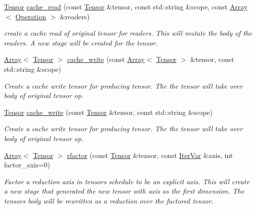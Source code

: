 \begin{DoxyCompactItemize}
\hyperlink{classtvm_1_1te_1_1Tensor}{Tensor} \hyperlink{classtvm_1_1te_1_1Schedule_a38ef95a62faf0c15f132847efa20249b}{cache\+\_\+read} (const \hyperlink{classtvm_1_1te_1_1Tensor}{Tensor} \&tensor, const std\+::string \&scope, const \hyperlink{classtvm_1_1Array}{Array}$<$ \hyperlink{classtvm_1_1te_1_1Operation}{Operation} $>$ \&readers)
\begin{DoxyCompactList}\small\item\em create a cache read of original tensor for readers. This will mutate the body of the readers. A new stage will be created for the tensor. \end{DoxyCompactList}\item 
\hyperlink{classtvm_1_1Array}{Array}$<$ \hyperlink{classtvm_1_1te_1_1Tensor}{Tensor} $>$ \hyperlink{classtvm_1_1te_1_1Schedule_ada9825f59ef130a0ab0b3a01ea348d71}{cache\+\_\+write} (const \hyperlink{classtvm_1_1Array}{Array}$<$ \hyperlink{classtvm_1_1te_1_1Tensor}{Tensor} $>$ \&tensor, const std\+::string \&scope)
\begin{DoxyCompactList}\small\item\em Create a cache write tensor for producing tensor. The the tensor will take over body of original tensor op. \end{DoxyCompactList}\item 
\hyperlink{classtvm_1_1te_1_1Tensor}{Tensor} \hyperlink{classtvm_1_1te_1_1Schedule_a15582f96d0aaf9a2bd9f2afcad3935d4}{cache\+\_\+write} (const \hyperlink{classtvm_1_1te_1_1Tensor}{Tensor} \&tensor, const std\+::string \&scope)
\begin{DoxyCompactList}\small\item\em Create a cache write tensor for producing tensor. The the tensor will take over body of original tensor op. \end{DoxyCompactList}\item 
\hyperlink{classtvm_1_1Array}{Array}$<$ \hyperlink{classtvm_1_1te_1_1Tensor}{Tensor} $>$ \hyperlink{classtvm_1_1te_1_1Schedule_a34ae85add41bbed0140726d024d08862}{rfactor} (const \hyperlink{classtvm_1_1te_1_1Tensor}{Tensor} \&tensor, const \hyperlink{classtvm_1_1tir_1_1IterVar}{Iter\+Var} \&axis, int factor\+\_\+axis=0)
\begin{DoxyCompactList}\small\item\em Factor a reduction axis in tensor\textquotesingle{}s schedule to be an explicit axis. This will create a new stage that generated the new tensor with axis as the first dimension. The tensor\textquotesingle{}s body will be rewritten as a reduction over the factored tensor. \end{DoxyCompactList}\item 

\end{DoxyCompactItemize}
